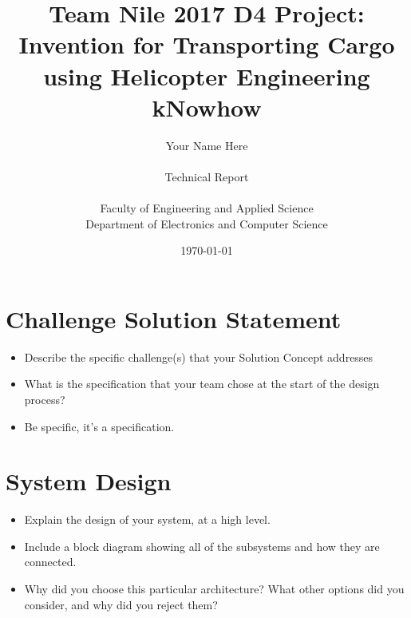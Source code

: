\documentclass[12pt]{report}
\begin{document}


\providecommand{\OT}[1]{\operatorname{\Theta}\bigl(#1\bigr)}
\providecommand{\OOm}[1]{\operatorname{\Omega}\bigl(#1\bigr)}


\title{Team Nile 2017 D4 Project: \\Invention for Transporting Cargo \\using Helicopter Engineering kNowhow}
\author{Your Name Here \\
\\
Technical Report\\
\\
Faculty of Engineering and Applied Science \\
Department of Electronics and Computer Science
}

\date{\today}

\maketitle


  
{ }





\tableofcontents


\chapter{Challenge Solution Statement} 
\begin{itemize}
\item Describe the specific challenge(s) that your Solution Concept addresses
\item What is the specification that your team chose at the start of the design process?
\item Be specific, it’s a specification.
\end{itemize}

\chapter{System Design } 
\begin{itemize}
\item Explain the design of your system, at a high level.
\item Include a block diagram showing all of the subsystems and how they are connected.
\item Why did you choose this particular architecture? What other options did you consider, and why did you reject them?

\end{itemize}
\end{document}
